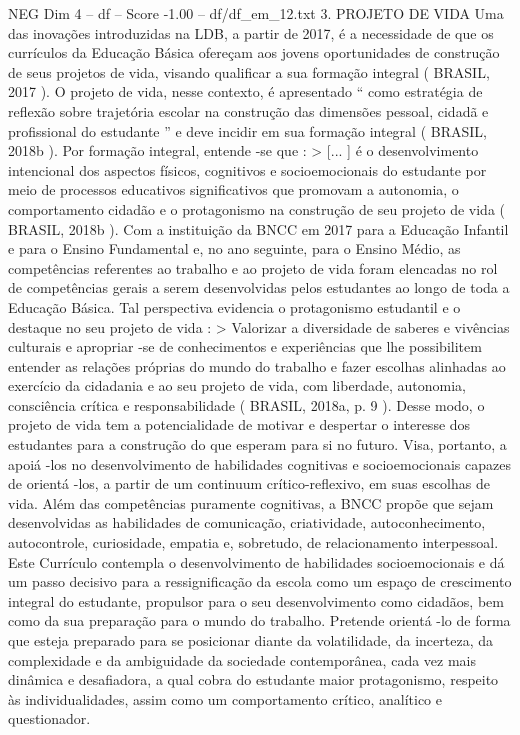 \begin{textsample}{NEG Dim 4 – df – Score -1.00 – df/df\_em\_12.txt}  \label{ex:f4_neg_068}
3.
PROJETO DE VIDA Uma das inovações introduzidas na LDB, a partir de 2017, é a necessidade de que os currículos da Educação Básica ofereçam aos jovens oportunidades de construção de seus projetos de vida, visando qualificar a sua formação integral ( BRASIL, 2017 ).
O projeto de vida, nesse contexto, é apresentado “ como estratégia de reflexão sobre trajetória escolar na construção das dimensões pessoal, cidadã e profissional do estudante ” e deve incidir em sua formação integral ( BRASIL, 2018b ).
Por formação integral, entende -se que : > [... ] é o desenvolvimento intencional dos aspectos físicos, cognitivos e socioemocionais do estudante por meio de processos educativos significativos que promovam a autonomia, o comportamento cidadão e o protagonismo na construção de seu projeto de vida ( BRASIL, 2018b ).
Com a instituição da BNCC em 2017 para a Educação Infantil e para o Ensino Fundamental e, no ano seguinte, para o Ensino Médio, as competências referentes ao trabalho e ao projeto de vida foram elencadas no rol de competências gerais a serem desenvolvidas pelos estudantes ao longo de toda a Educação Básica.
Tal perspectiva evidencia o protagonismo estudantil e o destaque no seu projeto de vida : > Valorizar a diversidade de saberes e vivências culturais e apropriar -se de conhecimentos e experiências que lhe possibilitem entender as relações próprias do mundo do trabalho e fazer escolhas alinhadas ao exercício da cidadania e ao seu projeto de vida, com liberdade, autonomia, consciência crítica e responsabilidade ( BRASIL, 2018a, p. 9 ).
Desse modo, o projeto de vida tem a potencialidade de motivar e despertar o interesse dos estudantes para a construção do que esperam para si no futuro.
Visa, portanto, a apoiá -los no desenvolvimento de habilidades cognitivas e socioemocionais capazes de orientá -los, a partir de um continuum crítico-reflexivo, em suas escolhas de vida.
Além das competências puramente cognitivas, a BNCC propõe que sejam desenvolvidas as habilidades de comunicação, criatividade, autoconhecimento, autocontrole, curiosidade, empatia e, sobretudo, de relacionamento interpessoal.
Este Currículo contempla o desenvolvimento de habilidades socioemocionais e dá um passo decisivo para a ressignificação da escola como um espaço de crescimento integral do estudante, propulsor para o seu desenvolvimento como cidadãos, bem como da sua preparação para o mundo do trabalho.
Pretende orientá -lo de forma que esteja preparado para se posicionar diante da volatilidade, da incerteza, da complexidade e da ambiguidade da sociedade contemporânea, cada vez mais dinâmica e desafiadora, a qual cobra do estudante maior protagonismo, respeito às individualidades, assim como um comportamento crítico, analítico e questionador.

\end{textsample}
